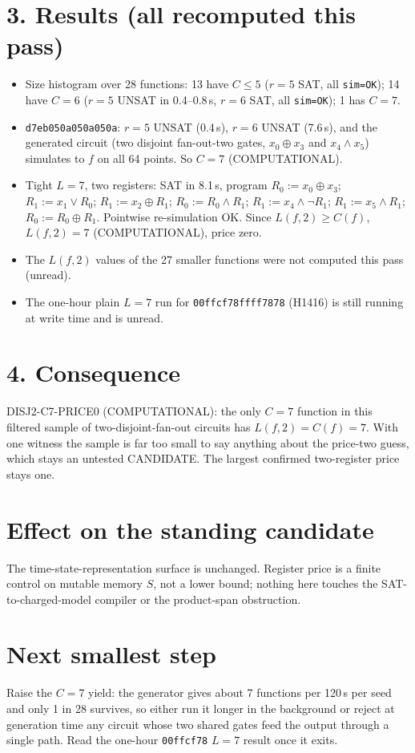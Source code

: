 \documentclass[11pt]{article}
\begin{document}
\section*{3. Results (all recomputed this pass)}
\begin{itemize}
\item Size histogram over 28 functions: 13 have $C\le5$ ($r=5$ SAT, all \texttt{sim=OK}); 14 have $C=6$ ($r=5$ UNSAT in 0.4--0.8\,s, $r=6$ SAT, all \texttt{sim=OK}); 1 has $C=7$.
\item \texttt{d7eb050a050a050a}: $r=5$ UNSAT (0.4\,s), $r=6$ UNSAT (7.6\,s), and the generated circuit (two disjoint fan-out-two gates, $x_0\oplus x_3$ and $x_4\wedge x_5$) simulates to $f$ on all 64 points. So $C=7$ (COMPUTATIONAL).
\item Tight $L=7$, two registers: SAT in 8.1\,s, program $R_0{:=}x_0\oplus x_3$; $R_1{:=}x_1\vee R_0$; $R_1{:=}x_2\oplus R_1$; $R_0{:=}R_0\wedge R_1$; $R_1{:=}x_4\wedge\neg R_1$; $R_1{:=}x_5\wedge R_1$; $R_0{:=}R_0\oplus R_1$. Pointwise re-simulation OK. Since $L(f,2)\ge C(f)$, $L(f,2)=7$ (COMPUTATIONAL), price zero.
\item The $L(f,2)$ values of the 27 smaller functions were not computed this pass (unread).
\item The one-hour plain $L=7$ run for \texttt{00ffcf78ffff7878} (H1416) is still running at write time and is unread.
\end{itemize}

\section*{4. Consequence}
DISJ2-C7-PRICE0 (COMPUTATIONAL): the only $C=7$ function in this filtered sample of two-disjoint-fan-out circuits has $L(f,2)=C(f)=7$. With one witness the sample is far too small to say anything about the price-two guess, which stays an untested CANDIDATE. The largest confirmed two-register price stays one.

\section*{Effect on the standing candidate}
The time-state-representation surface is unchanged. Register price is a finite control on mutable memory $S$, not a lower bound; nothing here touches the SAT-to-charged-model compiler or the product-span obstruction.

\section*{Next smallest step}
Raise the $C=7$ yield: the generator gives about 7 functions per 120\,s per seed and only 1 in 28 survives, so either run it longer in the background or reject at generation time any circuit whose two shared gates feed the output through a single path. Read the one-hour \texttt{00ffcf78} $L=7$ result once it exits.
\end{document}
